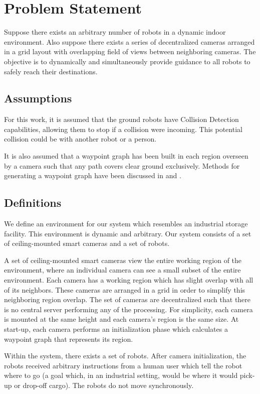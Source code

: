 \section{Problem Statement}
Suppose there exists an arbitrary number of robots in a dynamic indoor environment. Also suppose there exists a series of decentralized cameras arranged in a grid layout with overlapping field of views between neighboring cameras. The objective is to dynamically and simultaneously provide guidance to all robots to safely reach their destinations.

\subsection{Assumptions}
For this work, it is assumed that the ground robots have Collision Detection capabilities, allowing them to stop if a collision were incoming. This potential collision could be with another robot or a person.

It is also assumed that a waypoint graph has been built in each region overseen by a camera such that any path covers clear ground exclusively. Methods for generating a waypoint graph have been discussed in \cite{WaypointJia} and \cite{WaypointVideoGames}.

\subsection{Definitions}

We define an environment for our system which resembles an industrial storage facility. This environment is dynamic and arbitrary. Our system consists of a set of ceiling-mounted smart cameras and a set of robots. 

A set of ceiling-mounted smart cameras view the entire working region of the environment, where an individual camera can see a small subset of the entire environment. Each camera has a working region which has slight overlap with all of its neighbors. These cameras are arranged in a grid in order to simplify this neighboring region overlap. The set of cameras are decentralized such that there is no central server performing any of the processing. For simplicity, each camera is mounted at the same height and each camera's region is the same size. At start-up, each camera performs an initialization phase which calculates a waypoint graph that represents its region.

Within the system, there exists a set of robots. After camera initialization, the robots received arbitrary instructions from a human user which tell the robot where to go (a goal which, in an industrial setting, would be where it would pick-up or drop-off cargo). The robots do not move synchronously. 

